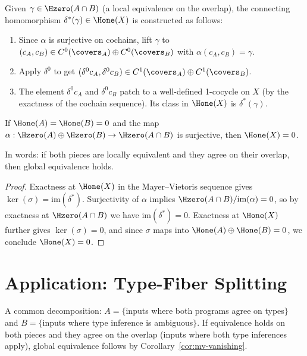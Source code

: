 \begin{definition}
\label{def:connecting-hom}
Given $\gamma \in \Hzero(A \cap B)$ (a local equivalence on the
overlap), the connecting homomorphism $\delta^*(\gamma) \in \Hone(X)$
is constructed as follows:
\begin{enumerate}
  \item Since $\alpha$ is surjective on cochains, lift $\gamma$ to
    $(c_A, c_B) \in C^0(\covers_A) \oplus C^0(\covers_B)$ with
    $\alpha(c_A, c_B) = \gamma$.
  \item Apply $\delta^0$ to get $(\delta^0 c_A, \delta^0 c_B) \in
    C^1(\covers_A) \oplus C^1(\covers_B)$.
  \item The element $\delta^0 c_A$ and $\delta^0 c_B$ patch to a
    well-defined 1-cocycle on $X$ (by the exactness of the cochain
    sequence).  Its class in $\Hone(X)$ is $\delta^*(\gamma)$.
\end{enumerate}
\end{definition}

\begin{corollary}
\label{cor:mv-vanishing}
If $\Hone(A) = \Hone(B) = 0$ and the map $\alpha : \Hzero(A) \oplus
\Hzero(B) \to \Hzero(A \cap B)$ is surjective, then $\Hone(X) = 0$.

In words: if both pieces are locally equivalent and they agree on
their overlap, then global equivalence holds.
\end{corollary}

\begin{proof}
Exactness at $\Hone(X)$ in the Mayer--Vietoris sequence gives
$\ker(\sigma) = \mathrm{im}(\delta^*)$.  Surjectivity of $\alpha$
implies $\Hzero(A \cap B) / \mathrm{im}(\alpha) = 0$, so by
exactness at $\Hzero(A \cap B)$ we have $\mathrm{im}(\delta^*) = 0$.
Exactness at $\Hone(X)$ further gives $\ker(\sigma) = 0$, and since
$\sigma$ maps into $\Hone(A) \oplus \Hone(B) = 0$, we conclude
$\Hone(X) = 0$.
\end{proof}

\section{Application: Type-Fiber Splitting}

\begin{example}
\label{ex:mv-typed}
A common decomposition: $A = \{$inputs where both programs agree
on types$\}$ and $B = \{$inputs where type inference is ambiguous$\}$.
If equivalence holds on both pieces and they agree on the overlap
(inputs where both type inferences apply), global equivalence follows
by Corollary~\ref{cor:mv-vanishing}.
\end{example}

